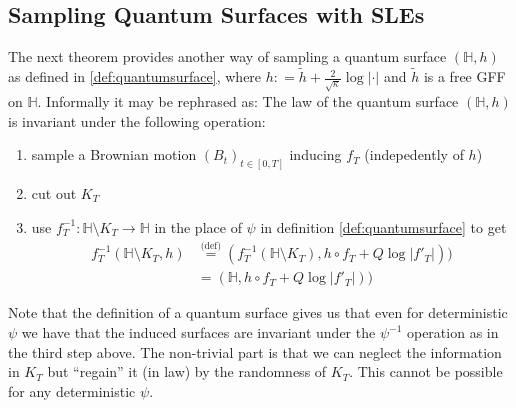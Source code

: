 \documentclass[11pt,reqno]{amsart}
\numberwithin{equation}{section}
\newtheorem{thm}{Theorem}[section]
\newtheorem{rem}[thm]{Remark}
\newcommand{\eqbydef}{\mathrel{\stackrel{\text{(def)}}{=}}}
\newcommand{\deq}{\mathrel{\mathop:}=}
\newcommand{\eps}{\varepsilon}
\begin{document}
\subsection{Sampling Quantum Surfaces with SLEs}
The next theorem provides another way of sampling a quantum surface $(\mathbb H,h)$ as defined in \ref{def:quantumsurface}, where $h\deq \tilde h+\frac{2}{\sqrt\kappa}\log|\cdot|$ and $\tilde h$ is a free GFF on $\mathbb H$. Informally it may be rephrased as:
The law of the quantum surface $(\mathbb H,h)$ is invariant under the following operation:
\begin{enumerate}
	\item sample a Brownian motion $(B_t)_{t\in[0,T]}$ inducing $f_T$ (indepedently of $h$)
	\item cut out $K_T$
	\item use $f_T^{-1}:\mathbb H\setminus K_T\rightarrow\mathbb H$ in the place of $\psi$ in definition \ref{def:quantumsurface} to get \begin{align*}
			f_T^{-1}(\mathbb H\setminus K_T, h)&\eqbydef (f_T^{-1}(\mathbb H\setminus K_T),h\circ f_T+Q\log|f'_T|))\\ &= (\mathbb H,h\circ f_T+Q\log|f'_T|))
		\end{align*}
\end{enumerate}
Note that the definition of a quantum surface gives us that even for deterministic $\psi$ we have that the induced surfaces are invariant under the $\psi^{-1}$ operation as in the third step above. The non-trivial part is that we can neglect the information in $K_T$ but ``regain'' it (in law) by the randomness of $K_T$. This cannot be possible for any deterministic $\psi$.



	
	

\end{document}
